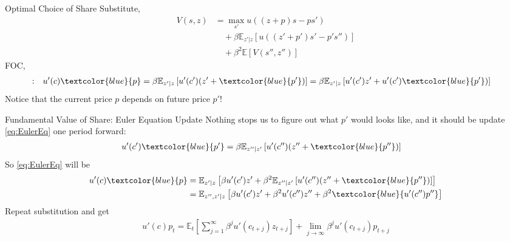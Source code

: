 \documentclass[aspectratio=169,xcolor=dvipsnames]{beamer}
\newcommand{\blue}[1]{\textcolor{blue}{#1}}
\begin{document}
\begin{frame}{Optimal Choice of Share}
\label{slide:Optimal_Choice_of_Share}
    Substitute,
    \begin{align*}
        V(s, z)
            & = \max_{s'} u\left(
                (z+p)s - ps'
            \right)         \\
            & \quad + \beta \mathbb{E}_{z'|z} \left[
                u\left(
                 (z'+p')s' - p's''
            \right)
            \right]
        \\
            & \quad + \beta^{2} \mathbb{E} [V(s'', z'')]
    \end{align*}
    FOC,
    \begin{align}
        [s']: \quad
            & u'(c) \blue{p} = \beta \mathbb{E}_{z'|z} \left[
                u'(c') (z' + \blue{p'})
            \right] = \beta \mathbb{E}_{z'|z} \left[
                u'(c') z' + u'(c') \blue{p'})
            \right]
            \label{eq:EulerEq}
    \end{align}
    Notice that the current price $ p $ depends on future price $ p' $!
\end{frame}

\begin{frame}{Fundamental Value of Share: Euler Equation Update}
\label{slide:Fundamental_Value_of_Share__Euler_Equation_Update}
    Nothing stops us to figure out what $ p' $ would looks like, and it should be update \eqref{eq:EulerEq} one period forward:
    \begin{align*}
        u'(c') \blue{p'} & = \beta \mathbb{E}_{z''|z'} \left[
            u'(c'') (z'' + \blue{p''})
            \right] \label{eq:EulerEqUpdate}
    \end{align*}
    So \eqref{eq:EulerEq} will be
    \begin{align}
        u'(c) \blue{p}
            & = \mathbb{E}_{z'|z} \left[
                \beta u'(c') z' + \beta^{2} \mathbb{E}_{z''|z'} \left[
                u'(c'') (z'' + \blue{p''})
            \right]
            \right]
        \\
            & = \mathbb{E}_{z'',z'|z} \left[
                \beta u'(c') z' + \beta^{2} u'(c'') z'' + \beta^{2} \blue{u'(c'')p''}
            \right]
    \end{align}
    Repeat substitution and get
    \begin{align}
        u'(c) p_{t} = \mathbb{E}_{t}\left[
            \sum_{j=1}^{\infty} \beta^{j} u'(c_{t+j}) z_{t+j}
        \right]
        +
        \lim_{j\rightarrow \infty} \beta^{j} u'(c_{t+j}) p_{t+j}
    \end{align}
\end{frame}
\end{document}
